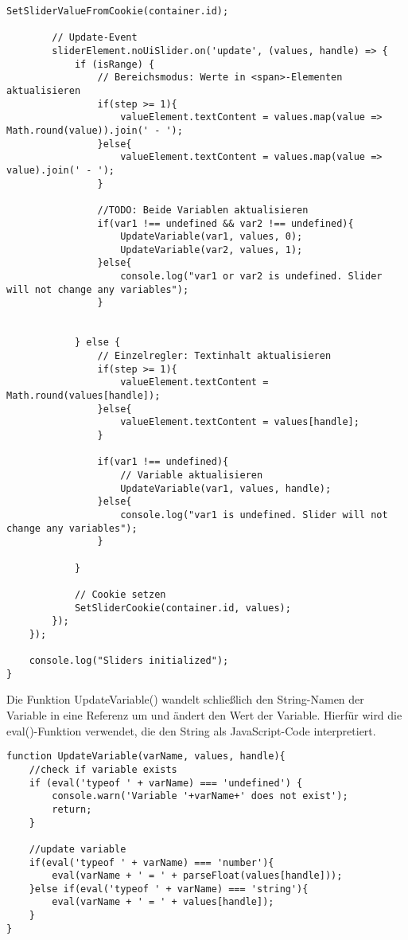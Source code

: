 \begin{lstlisting}[style=JavaScript]
        SetSliderValueFromCookie(container.id);

        // Update-Event
        sliderElement.noUiSlider.on('update', (values, handle) => {
            if (isRange) {
                // Bereichsmodus: Werte in <span>-Elementen aktualisieren
                if(step >= 1){
                    valueElement.textContent = values.map(value => Math.round(value)).join(' - ');
                }else{
                    valueElement.textContent = values.map(value => value).join(' - ');
                }

                //TODO: Beide Variablen aktualisieren
                if(var1 !== undefined && var2 !== undefined){
                    UpdateVariable(var1, values, 0);
                    UpdateVariable(var2, values, 1);
                }else{
                    console.log("var1 or var2 is undefined. Slider will not change any variables");
                }


            } else {
                // Einzelregler: Textinhalt aktualisieren
                if(step >= 1){
                    valueElement.textContent = Math.round(values[handle]);
                }else{
                    valueElement.textContent = values[handle];
                }

                if(var1 !== undefined){
                    // Variable aktualisieren
                    UpdateVariable(var1, values, handle);
                }else{
                    console.log("var1 is undefined. Slider will not change any variables");
                }

            }

            // Cookie setzen
            SetSliderCookie(container.id, values);
        });
    });

    console.log("Sliders initialized");
}
\end{lstlisting}

Die Funktion UpdateVariable() wandelt schließlich den String-Namen der Variable in eine Referenz um und ändert den Wert der Variable. Hierfür wird die eval()-Funktion verwendet, die den String als JavaScript-Code interpretiert.

\begin{lstlisting}[style=JavaScript]
function UpdateVariable(varName, values, handle){
    //check if variable exists
    if (eval('typeof ' + varName) === 'undefined') {
        console.warn('Variable '+varName+' does not exist');
        return;
    }

    //update variable
    if(eval('typeof ' + varName) === 'number'){
        eval(varName + ' = ' + parseFloat(values[handle]));
    }else if(eval('typeof ' + varName) === 'string'){
        eval(varName + ' = ' + values[handle]);
    }
}
\end{lstlisting}

